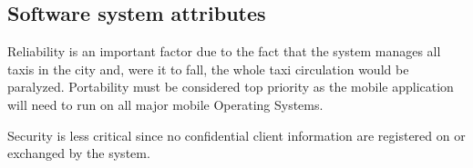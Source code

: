 \subsection{Software system attributes}
Reliability is an important factor due to the fact that the system manages all taxis in the city and, were it to fall, the whole taxi circulation would be paralyzed. Portability must be considered top priority as the mobile application will need to run on all major mobile Operating Systems.

Security is less critical since no confidential client information are registered on or exchanged by the system.

